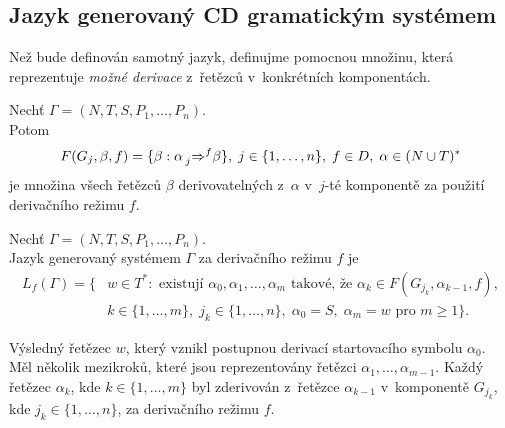 \subsection*{Jazyk generovaný CD gramatickým systémem}
Než bude definován samotný jazyk, definujme pomocnou množinu, která reprezentuje \emph{možné derivace} z~řetězců v~konkrétních komponentách.
\begin{definition}\label{def_mozne_derivace}
    Nechť $\Gamma = (N, T, S, P_1, \ldots, P_n)$. \\  
    Potom 
    \begin{equation*}
        F(G_j,\beta,f)=\{\beta : \alpha \prescript{}{j}{\Rightarrow^{f}}\beta\},\; j \in \{1, \ldots, n\},\; f\in D,\; \alpha \in (N \cup T)^{*}
    \end{equation*}        
    je množina všech řetězců $\beta$ derivovatelných z~$\alpha$ v~$j$-té komponentě za použití derivačního režimu $f$.
\end{definition}

\begin{definition}\label{def_generovany_jazyk}
    Nechť $\Gamma = (N, T, S, P_1, \ldots, P_n)$. \\  
    Jazyk generovaný systémem $\Gamma$ za derivačního režimu $f$ je 
    \begin{align*}
         L_f(\Gamma) = \{&w \in T^*: \text{ existují } \alpha_0, \alpha_1,\ldots, \alpha_m \text{ takové, že } \alpha_k \in F(G_{j_{k}},\alpha_{k-1}, f),\\
         &k \in \{1, \ldots, m\},\;j_k \in \{1, \ldots, n\},\; \alpha_0 = S,\;\alpha_m = w \text{ pro } m \geq 1\}.
    \end{align*}        
\end{definition} 

Výsledný řetězec $w$, který vznikl postupnou derivací startovacího symbolu $\alpha_0$.
Měl několik mezikroků, které jsou reprezentovány řetězci $\alpha_1, \ldots, \alpha_{m-1}$.
Každý řetězec $\alpha_k$, kde $k \in \{1, \ldots, m\}$ byl zderivován z~řetězce $\alpha_{k-1}$ v~komponentě $G_{j_{k}}$, kde $j_k \in \{1, \ldots, n\}$, za derivačního režimu $f$.

